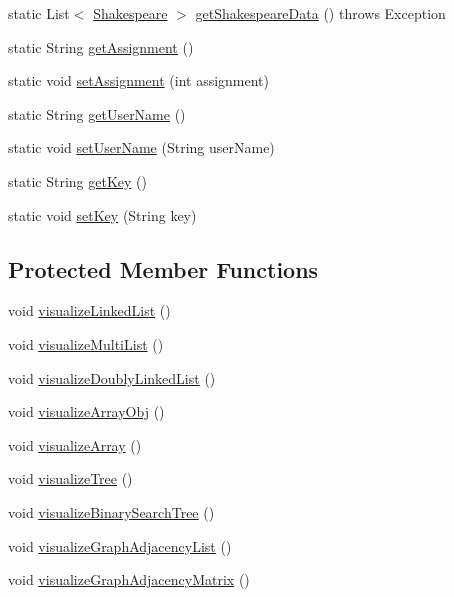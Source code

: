\begin{DoxyCompactItemize}
static List$<$ \hyperlink{classbridges_1_1data__src__dependent_1_1_shakespeare}{Shakespeare} $>$ \hyperlink{classbridges_1_1connect_1_1_bridges_a03ba87a09742cfb40f357253239006e6}{get\+Shakespeare\+Data} ()  throws Exception 
\item 
static String \hyperlink{classbridges_1_1connect_1_1_bridges_ae488b9bf0d696adb7f5a6ba7ce4ff2fd}{get\+Assignment} ()
\item 
static void \hyperlink{classbridges_1_1connect_1_1_bridges_a24c91901a59ab8b715a864ab8a4d9cdc}{set\+Assignment} (int assignment)
\item 
static String \hyperlink{classbridges_1_1connect_1_1_bridges_a5ff3fdd97d4c71c9c2141c3355e417aa}{get\+User\+Name} ()
\item 
static void \hyperlink{classbridges_1_1connect_1_1_bridges_a2d84103645662308e58a1b473d3320ae}{set\+User\+Name} (String user\+Name)
\item 
static String \hyperlink{classbridges_1_1connect_1_1_bridges_a813a1783f7b547fdb964f8af87c66f4b}{get\+Key} ()
\item 
static void \hyperlink{classbridges_1_1connect_1_1_bridges_a484992ce3fce273ca2caa215a4488e3c}{set\+Key} (String key)
\end{DoxyCompactItemize}
\subsection*{Protected Member Functions}
\begin{DoxyCompactItemize}
\item 
void \hyperlink{classbridges_1_1connect_1_1_bridges_ae9ce2673d2eef1da7f6e1359c494f6fe}{visualize\+Linked\+List} ()
\item 
void \hyperlink{classbridges_1_1connect_1_1_bridges_af3b189a5b95710e3bc3685e85572478f}{visualize\+Multi\+List} ()
\item 
void \hyperlink{classbridges_1_1connect_1_1_bridges_ac1ac1db8cf7123aefb83ab05af83375d}{visualize\+Doubly\+Linked\+List} ()
\item 
void \hyperlink{classbridges_1_1connect_1_1_bridges_a7533ebb339527a3a824fc7af21a1d5c9}{visualize\+Array\+Obj} ()
\item 
void \hyperlink{classbridges_1_1connect_1_1_bridges_ac4e90699b288fcfbaf19e59bc4dbafb3}{visualize\+Array} ()
\item 
void \hyperlink{classbridges_1_1connect_1_1_bridges_abd8fa1ef8d6c5d3e6c533ee069d24d85}{visualize\+Tree} ()
\item 
void \hyperlink{classbridges_1_1connect_1_1_bridges_a283d29561d78a890f01c8735c18d17d0}{visualize\+Binary\+Search\+Tree} ()
\item 
void \hyperlink{classbridges_1_1connect_1_1_bridges_a7470f7a358eee6a6cded3ab42f8b9cdc}{visualize\+Graph\+Adjacency\+List} ()
\item 
void \hyperlink{classbridges_1_1connect_1_1_bridges_a13c154c2a656dd4c19f2ff0e767f63c3}{visualize\+Graph\+Adjacency\+Matrix} ()
\end{DoxyCompactItemize}
